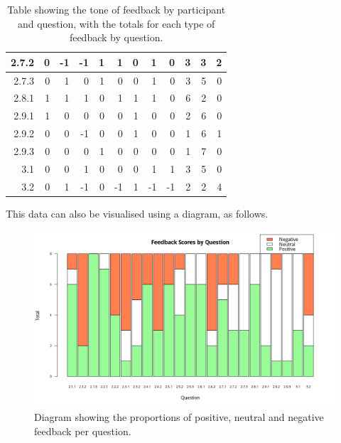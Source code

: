 \documentclass[12pt,twoside,notitlepage,xetex]{report}
\begin{document}
{\begin{center}
\begin{table}[H]
\begin{center}
\begin{tabular}{|r||r|r|r|r||r|r|r|r||r|r|r|}
2.7.2 & 0 & -1 & -1 & 1 & 1 & 0 & 1 & 0 & 3 & 3 & 2\\ \hline
2.7.3 & 0 & 1 & 0 & 1 & 0 & 0 & 1 & 0 & 3 & 5 & 0\\ \hline
2.8.1 & 1 & 1 & 1 & 0 & 1 & 1 & 1 & 0 & 6 & 2 & 0\\ \hline
2.9.1 & 1 & 0 & 0 & 0 & 0 & 1 & 0 & 0 & 2 & 6 & 0\\ \hline
2.9.2 & 0 & 0 & -1 & 0 & 0 & 1 & 0 & 0 & 1 & 6 & 1\\ \hline
2.9.3 & 0 & 0 & 0 & 1 & 0 & 0 & 0 & 0 & 1 & 7 & 0\\ \hline
3.1 & 0 & 0 & 1 & 0 & 0 & 0 & 1 & 1 & 3 & 5 & 0\\ \hline
3.2 & 0 & 1 & -1 & 0 & -1 & 1 & -1 & -1 & 2 & 2 & 4\\
\hline
\end{tabular}
\end{center}
\caption{Table showing the tone of feedback by participant and question, with the totals for each type of feedback by question.}
\label{tab:FeedbackScores}
\end{table}
\end{center}

This data can also be visualised using a diagram, as follows.

\begin{center}
\begin{figure}[H]
\begin{center}
\includegraphics[width=\textwidth]{figs/graphs/stacked-scores.png}
\end{center}
\caption{Diagram showing the proportions of positive, neutral and negative feedback per question.}
\label{fig:StackedScores}
\end{figure}
\end{center}

}
\end{document}
